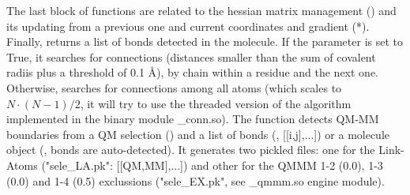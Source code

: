 The last block of functions are related to the hessian matrix management () and its updating from a previous one and current coordinates and gradient (*).\\
Finally,  returns a list of bonds detected in the molecule. If the parameter  is set to True, it searches for connections (distances smaller than the sum of covalent radiis plus a threshold of 0.1 Å), by chain within a residue and the next one. Otherwise, searches for connections among all atoms (which scales to $N \cdot (N-1)/2$, it will try to use the threaded version of the algorithm implemented in the binary module \_conn.so). The function
 detects QM-MM boundaries from a QM selection () and a list of bonds (, [[i,j],...]) or a molecule object (, bonds are auto-detected). It generates two pickled files: one for the Link-Atoms ("sele\_LA.pk": [[QM,MM],...]) and other for the QMMM 1-2 (0.0), 1-3 (0.0) and 1-4 (0.5) exclussions ("sele\_EX.pk", see \_qmmm.so engine module).
\footnotesize
